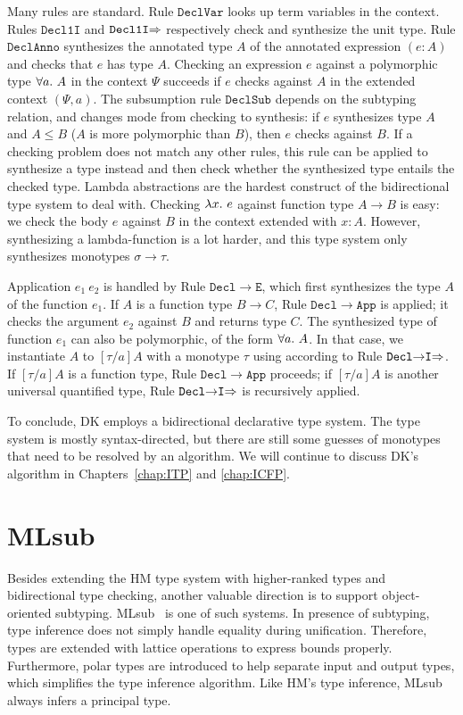 Many rules are standard.
Rule $\mathtt{DeclVar}$ looks up term variables in the context.
Rules $\mathtt{Decl1I}$ and $\mathtt{Decl1I{\Rightarrow}}$ respectively check and synthesize the unit type.
Rule $\mathtt{DeclAnno}$ synthesizes the annotated type $A$ of the annotated expression $(e:A)$
and checks that $e$ has type $A$.
Checking an expression $e$ against a polymorphic type $\all A$ in the context $\Psi$ succeeds
if $e$ checks against $A$ in the extended context $(\Psi, a)$.
The subsumption rule $\mathtt{DeclSub}$ depends on the subtyping relation,
and changes mode from checking to synthesis: if $e$ synthesizes type $A$ and $A\le B$
($A$ is more polymorphic than $B$), then $e$ checks against $B$.
If a checking problem does not match any other rules,
this rule can be applied to synthesize a type instead and then
check whether the synthesized type entails the checked type.
Lambda abstractions are the hardest construct of the bidirectional
type system to deal with. 
Checking $\lam e$ against function type $A\to B$ is easy:
we check the body $e$ against $B$ in the context extended with $x:A$.
However, synthesizing a lambda-function is a lot harder, and 
this type system only synthesizes monotypes $\sigma\to\tau$.

Application $e_1~e_2$ is handled by Rule $\mathtt{Decl{\to}E}$,
which first synthesizes the type $A$ of the function $e_1$.
If $A$ is a function type $B\to C$, Rule $\mathtt{Decl{\to}App}$ is applied;
it checks the argument $e_2$ against $B$ and returns type $C$.
The synthesized type of function $e_1$ can also be polymorphic, of the form $\all A$.
In that case, we instantiate $A$ to $[\tau/a]A$ with a monotype $\tau$ %
using according to Rule $\mathtt{Decl{\to}I{\Rightarrow}}$.
If $[\tau/a]A$ is a function type, Rule $\mathtt{Decl{\to}App}$ proceeds;
if $[\tau/a]A$ is another universal quantified type,
Rule $\mathtt{Decl{\to}I{\Rightarrow}}$ is recursively applied.

To conclude, DK employs a bidirectional declarative type system.
The type system is mostly syntax-directed, but there are still
some guesses of monotypes that need to be resolved by an algorithm.
We will continue to discuss DK's algorithm in Chapters~\ref{chap:ITP} and \ref{chap:ICFP}.


\section{MLsub}\label{sec:mlsub}

Besides extending the HM type system with higher-ranked types and bidirectional type checking,
another valuable direction is to support object-oriented subtyping.
MLsub~\citep{mlsub} is one of such systems.
In presence of subtyping, type inference does not simply handle equality during unification.
Therefore, types are extended with lattice operations to express bounds properly.
Furthermore, polar types are introduced to help separate input and output types,
which simplifies the type inference algorithm.
Like HM's type inference, MLsub always infers a principal type.

